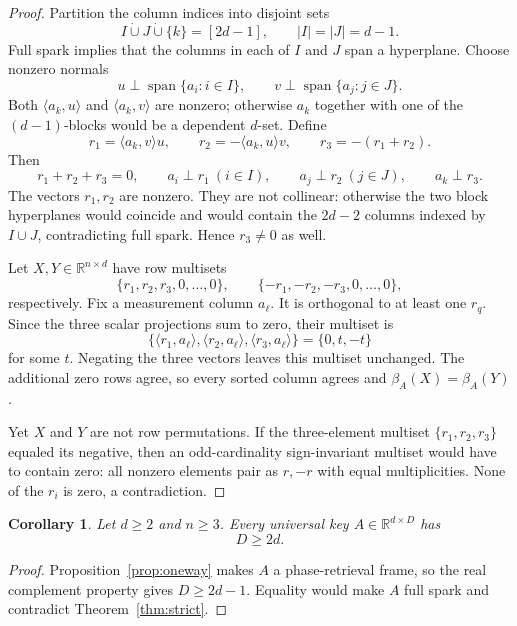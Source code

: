 \documentclass[11pt]{article}
\newtheorem{corollary}[theorem]{Corollary}
\newcommand{\R}{\mathbb R}
\begin{document}
\begin{proof}
Partition the column indices into disjoint sets
\[
 I\mathbin{\dot\cup}J\mathbin{\dot\cup}\{k\}
 =[2d-1],\qquad |I|=|J|=d-1.
\]
Full spark implies that the columns in each of \(I\) and \(J\) span a
hyperplane.  Choose nonzero normals
\[
 u\perp\operatorname{span}\{a_i:i\in I\},\qquad
 v\perp\operatorname{span}\{a_j:j\in J\}.
\]
Both \(\langle a_k,u\rangle\) and \(\langle a_k,v\rangle\) are nonzero;
otherwise \(a_k\) together with one of the \((d-1)\)-blocks would be a
dependent \(d\)-set.  Define
\[
 r_1=\langle a_k,v\rangle u,\qquad
 r_2=-\langle a_k,u\rangle v,\qquad
 r_3=-(r_1+r_2).
\]
Then
\[
 r_1+r_2+r_3=0,\qquad
 a_i\perp r_1\ (i\in I),\qquad
 a_j\perp r_2\ (j\in J),\qquad
 a_k\perp r_3.
\]
The vectors \(r_1,r_2\) are nonzero.  They are not collinear: otherwise the
two block hyperplanes would coincide and would contain the \(2d-2\) columns
indexed by \(I\cup J\), contradicting full spark.  Hence \(r_3\ne0\) as well.

Let \(X,Y\in\R^{n\times d}\) have row multisets
\[
 \{r_1,r_2,r_3,0,\ldots,0\},\qquad
 \{-r_1,-r_2,-r_3,0,\ldots,0\},
\]
respectively.  Fix a measurement column \(a_\ell\).  It is orthogonal to at
least one \(r_q\).  Since the three scalar projections sum to zero, their
multiset is
\[
 \{\langle r_1,a_\ell\rangle,
   \langle r_2,a_\ell\rangle,
   \langle r_3,a_\ell\rangle\}
 =\{0,t,-t\}
\]
for some \(t\).  Negating the three vectors leaves this multiset unchanged.
The additional zero rows agree, so every sorted column agrees and
\(\beta_A(X)=\beta_A(Y)\).

Yet \(X\) and \(Y\) are not row permutations.  If the three-element
multiset \(\{r_1,r_2,r_3\}\) equaled its negative, then an odd-cardinality
sign-invariant multiset would have to contain zero: all nonzero elements pair
as \(r,-r\) with equal multiplicities.  None of the \(r_i\) is zero, a
contradiction.
\end{proof}

\begin{corollary}\label{cor:count}
Let \(d\ge2\) and \(n\ge3\).  Every universal key
\(A\in\R^{d\times D}\) has
\[
 D\ge2d.
\]
\end{corollary}

\begin{proof}
Proposition~\ref{prop:oneway} makes \(A\) a phase-retrieval frame, so the
real complement property gives \(D\ge2d-1\).  Equality would make \(A\)
full spark and contradict Theorem~\ref{thm:strict}.
\end{proof}
\end{document}
